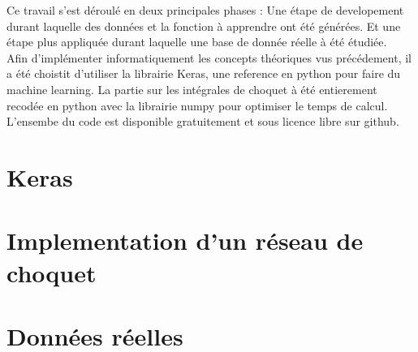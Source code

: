 Ce travail s'est déroulé en deux principales phases :
Une étape de developement durant laquelle des données et la fonction à apprendre ont été générées.
Et une étape plus appliquée durant laquelle une base de donnée réelle à été étudiée.\\


Afin d'implémenter informatiquement les concepts théoriques vus précédement,
il a été choistit d'utiliser la librairie Keras\cite{keras}, une reference en python pour faire du machine learning.
La partie sur les intégrales de choquet à été entierement recodée en python
avec la librairie numpy\cite{numpy} pour optimiser le temps de calcul.
L'ensembe du code est disponible gratuitement et sous licence libre sur github\cite{repoStage}.

\section{Keras}\label{sec:keras}


\newpage
\section{Implementation d'un réseau de choquet}\label{sec:implementation-choquet}


\newpage
\section{Données réelles}\label{sec:données-réelles}


